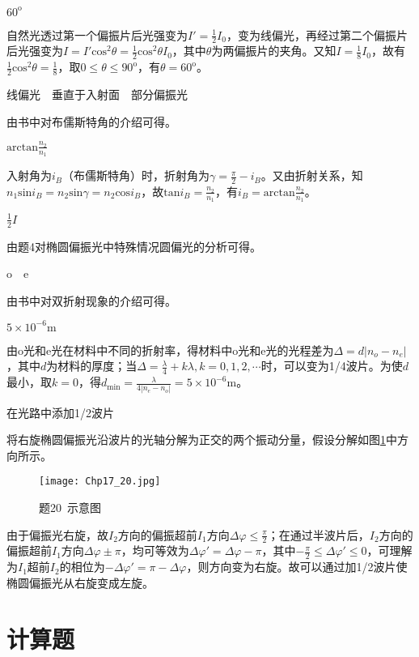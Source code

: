 \exercise $60^{\mathrm{o}}$

\solve 自然光透过第一个偏振片后光强变为$I'=\frac{1}{2}I_0$，变为线偏光，再经过第二个偏振片后光强变为$I=I'\mathrm{cos}^2\theta=\frac{1}{2}\mathrm{cos}^2\theta I_0$，其中$\theta$为两偏振片的夹角。又知$I=\frac{1}{8}I_0$，故有$\frac{1}{2}\mathrm{cos}^2\theta=\frac{1}{8}$，取$0\leqslant\theta\leqslant 90^{\mathrm{o}}$，有$\theta=60^{\mathrm{o}}$。

\exercise 线偏光$\quad$垂直于入射面$\quad$部分偏振光

\solve 由书中对布儒斯特角的介绍可得。

\exercise $\mathrm{arctan}\frac{n_2}{n_1}$

\solve 入射角为$i_B$（布儒斯特角）时，折射角为$\gamma=\frac{\pi}{2}-i_B$。又由折射关系，知$n_1\mathrm{sin}i_B=n_2\mathrm{sin}\gamma=n_2\mathrm{cos}i_B$，故$\mathrm{tan}i_B=\frac{n_2}{n_1}$，有$i_B=\mathrm{arctan}\frac{n_2}{n_1}$。

\exercise $\frac{1}{2}I$

\solve 由题4对椭圆偏振光中特殊情况圆偏光的分析可得。

\exercise o$\quad$e

由书中对双折射现象的介绍可得。

\exercise $5\times 10^{-6}\mathrm{m}$

\solve 由o光和e光在材料中不同的折射率，得材料中o光和e光的光程差为$\Delta=d|n_o-n_e|$，其中$d$为材料的厚度；当$\Delta=\frac{\lambda}{4}+k\lambda,k=0,1,2,\cdots$时，可以变为1/4波片。为使$d$最小，取$k=0$，得$d_{\mathrm{min}}=\frac{\lambda}{4|n_e-n_o|}=5\times 10^{-6}\mathrm{m}$。

\exercise 在光路中添加1/2波片

\solve 将右旋椭圆偏振光沿波片的光轴分解为正交的两个振动分量，假设分解如图\ref{fig:17_20}中方向所示。

\begin{figure}[htbp]
	\centering
	\texttt{[image: Chp17\_20.jpg]}
	\caption{题20\ 示意图}
	\label{fig:17_20}
\end{figure}

由于偏振光右旋，故$I_2$方向的偏振超前$I_1$方向$\Delta \varphi\leqslant\frac{\pi}{2}$；在通过半波片后，$I_2$方向的偏振超前$I_1$方向$\Delta \varphi\pm\pi$，均可等效为$\Delta \varphi'=\Delta \varphi-\pi$，其中$-\frac{\pi}{2}\leqslant\Delta \varphi'\leqslant0$，可理解为$I_1$超前$I_2$的相位为$-\Delta \varphi'=\pi-\Delta \varphi$，则方向变为右旋。故可以通过加1/2波片使椭圆偏振光从右旋变成左旋。

\section{计算题}
\exercise 

